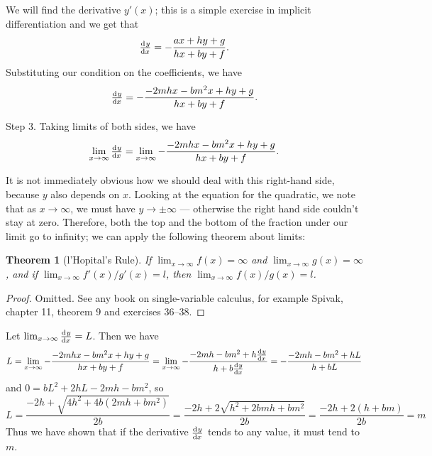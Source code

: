 \documentclass[a4paper,leqno,10pt]{article}
\theoremstyle{exercise}
\theoremstyle{plain}
\newtheorem*{thm}{Theorem}
\theoremstyle{definition}
\theoremstyle{remark}
\begin{document}
We will find the derivative $ y'(x) $; this is a simple exercise in implicit differentiation and we get that
\begin{displaymath}
  \od{y}{x} = -\frac{ax + hy + g}{hx + by + f}.
\end{displaymath}
Substituting our condition on the coefficients, we have
\begin{displaymath}
  \od{y}{x} = -\frac{-2mhx - bm^2x + hy + g}{hx + by + f}.
\end{displaymath}

Step 3. Taking limits of both sides, we have
\begin{displaymath}
  \lim_{x \to \infty} \od{y}{x} = \lim_{x \to \infty} -\frac{-2mhx - bm^2x + hy + g}{hx + by + f}.
\end{displaymath}

It is not immediately obvious how we should deal with this right-hand side, because $ y $ also depends
on $ x $. Looking at the equation for the quadratic, we note that as $ x \to \infty $, we must have $ y \to \pm\infty $ ---
otherwise the right hand side couldn't stay at zero. Therefore, both the top and the bottom of the fraction under our
limit go to infinity; we can apply the following theorem about limits:

\begin{thm}[l'Hopital's Rule]
  If $ \lim_{x \to \infty} f(x) = \infty $ and $ \lim_{x \to \infty} g(x) = \infty $, and if $ \lim_{x\to\infty} f'(x)/g'(x) = l $,
  then $ \lim_{x\to\infty} f(x)/g(x) = l $.
\end{thm}
\begin{proof}
  Omitted. See any book on single-variable calculus, for example Spivak, chapter 11, theorem 9 and exercises 36--38.
\end{proof}

Let $ \lim_{x \to \infty} \od{y}{x} = L $. Then we have
\begin{displaymath}
  L = \lim_{x \to \infty} -\frac{-2mhx - bm^2x + hy + g}{hx + by + f} = \lim_{x \to \infty} -\frac{-2mh - bm^2 + h\od{y}{x}}{h + b\od{y}{x}}
                                                                      = -\frac{-2mh - bm^2 + hL}{h + bL}
\end{displaymath}
and $ 0 = bL^2 + 2hL - 2mh - bm^2 $, so
\begin{displaymath}
  L = \frac{-2h + \sqrt{4h^2 + 4b(2mh + bm^2)}}{2b} = \frac{-2h + 2\sqrt{h^2 + 2bmh + bm^2}}{2b}
                                                    = \frac{-2h + 2(h + bm)}{2b} = m
\end{displaymath}
Thus we have shown that if the derivative $ \od{y}{x} $ tends to any value, it must tend to $ m $.
\end{document}
